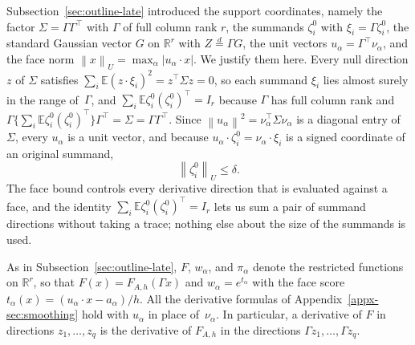 \documentclass[11pt,letterpaper]{article}
\newif\ifshowrev
\newenvironment{revblock}{\ifshowrev\color{revblue}%
\hypersetup{linkcolor=revblue,citecolor=revblue,urlcolor=revblue}\fi}{}
\newif\ifshowtrim
\newcommand{\trim}[1]{\ifshowtrim{\color{revblue}%
\hypersetup{linkcolor=revblue,citecolor=revblue,urlcolor=revblue}#1}\else#1\fi}
\theoremstyle{remark}
\newcommand{\E}{\mathbb E}
\newcommand{\R}{\mathbb R}
\newcommand{\norm}[1]{\left\lVert#1\right\rVert}
\begin{document}
\begin{revblock}
\trim{Subsection~\ref{sec:outline-late} introduced the support
coordinates, namely the factor \(\Sigma=\Gamma\Gamma^\top\) with
\(\Gamma\) of full column rank \(r\), the summands \(\zeta_i^0\) with
\(\xi_i=\Gamma\zeta_i^0\), the standard Gaussian vector \(G\) on
\(\R^r\) with \(Z\stackrel d=\Gamma G\), the unit vectors
\(u_\alpha=\Gamma^\top\nu_\alpha\), and the face norm
\(\norm x_U=\max_\alpha|u_\alpha\cdot x|\). We justify them here.}
Every null direction \(z\) of \(\Sigma\) satisfies
\(\sum_i\E(z\cdot\xi_i)^2=z^\top\Sigma z=0\), so each summand \(\xi_i\) lies
almost surely in the range of~\(\Gamma\)\trim{, and
\(\sum_i\E\zeta_i^0(\zeta_i^0)^\top=I_r\) because \(\Gamma\) has full
column rank and
\(\Gamma\{\sum_i\E\zeta_i^0(\zeta_i^0)^\top\}\Gamma^\top
=\Sigma=\Gamma\Gamma^\top\)}. Since
\(\norm{u_\alpha}^2=\nu_\alpha^\top\Sigma\nu_\alpha\) is a diagonal entry
of~\(\Sigma\), every \(u_\alpha\) is a unit vector\trim{, and because}
\(u_\alpha\cdot\zeta_i^0=\nu_\alpha\cdot\xi_i\) is a signed
coordinate of an original summand,
\begin{equation}
 \norm{\zeta_i^0}_U\le\delta.
 \label{appx-eq:projected-bound}
\end{equation}
The face bound controls every derivative direction that is evaluated
against a face, and the identity
\trim{\(\sum_i\E\zeta_i^0(\zeta_i^0)^\top=I_r\)} lets us sum a pair of
summand directions without taking a trace\trim{; nothing else about the
size of the summands is used}.

\trim{As in Subsection~\ref{sec:outline-late}, \(F\), \(w_\alpha\), and
\(\pi_\alpha\) denote the restricted functions on \(\R^r\), so that
\(F(x)=F_{A,h}(\Gamma x)\) and \(w_\alpha=e^{t_\alpha}\) with the face
score \(t_\alpha(x)=(u_\alpha\cdot x-a_\alpha)/h\). All} the
derivative formulas of Appendix~\ref{appx-sec:smoothing} hold with
\(u_\alpha\) in place of~\(\nu_\alpha\). In particular, a derivative of
\(F\) in directions \(z_1,\ldots,z_q\) is the derivative of \(F_{A,h}\)
in the directions \(\Gamma z_1,\ldots,\Gamma z_q\).


\end{revblock}
\end{document}
